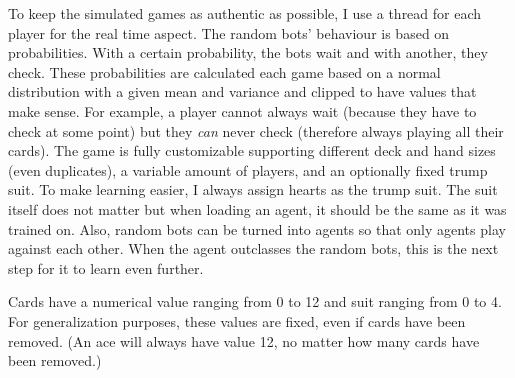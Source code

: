 \documentclass[a4paper,titlepage]{article}
\begin{document}
To keep the simulated games as authentic as possible, I use a thread for each player for the real time aspect. The random bots' behaviour is based on probabilities. With a certain probability, the bots wait and with another, they check. These probabilities are calculated each game based on a normal distribution with a given mean and variance and clipped to have values that make sense. For example, a player cannot always wait (because they have to check at some point) but they \emph{can} never check (therefore always playing all their cards). The game is fully customizable supporting different deck and hand sizes (even duplicates), a variable amount of players, and an optionally fixed trump suit. To make learning easier, I always assign hearts as the trump suit. The suit itself does not matter but when loading an agent, it should be the same as it was trained on. Also, random bots can be turned into agents so that only agents play against each other. When the agent outclasses the random bots, this is the next step for it to learn even further.

Cards have a numerical value ranging from 0 to 12 and suit ranging from 0 to 4. For generalization purposes, these values are fixed, even if cards have been removed. (An ace will always have value 12, no matter how many cards have been removed.) \medskip
\end{document}
